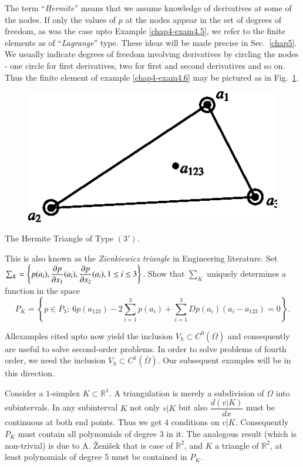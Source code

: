 \begin{remark}\label{chap4-rem4.2}
The term ``{\em Hermite}'' means that we assume knowledge of
derivatives at some of the nodes. If only the values of $p$ at the
nodes appear in the set of degrees of freedom, as was the case upto
Example \ref{chap4-exam4.5}, we refer to the finite elements as of
``{\em Lagrange}'' type. These ideas will be made precise in
Sec.~\ref{chap5}. We usually indicate degrees of freedom involving
derivatives by circling the nodes - one circle for first derivatives,
two for first and second derivatives and so on. Thus the finite
element of example \ref{chap4-exam4.6} may be pictured as in
Fig.~\ref{chap4-fig4.6}. 
\begin{figure}[H]
\centering
\includegraphics{figure/fig4.6.eps}
\caption{}\label{chap4-fig4.6}
\end{figure}
\end{remark}

\begin{exercise}\label{chap4-exer4.6}
The Hermite Triangle of Type $(3')$.

This is also known as the {\em Zienkiewicz triangle} in Engineering
literature. Set $\sum_{K}=\left\{p(a_{i}),\dfrac{\partial p}{\partial
  x_{1}}(a_{i}), \dfrac{\partial p}{\partial x_{2}}(a_{i}),1\leq i\leq
3\right\}$. Show that $\sum_{K}$ uniquely determines a function in the
space
$$
P_{K}=\left\{p\in
P_{3};\ 6p(a_{123})-2\sum^{3}_{i=1}p(a_{i})+\sum^{3}_{i=1}Dp(a_{i})(a_{i}-a_{123})=0\right\}. 
$$
\end{exercise}

All\pageoriginale examples cited upto now yield the inclusion
$V_{h}\subset C^{0}(\overline{\Omega})$ and consequently are useful to
solve second-order problems. In order to solve problems of fourth
order, we need the inclusion $V_{h}\subset
C^{1}(\overline{\Omega})$. Our subsequent examples will be in this
direction. 

\begin{remark}\label{chap4-rem4.3}
Consider a $1$-simplex $K\subset \mathbb{R}^{1}$. A triangulation is
merely a subdivision of $\Omega$ into subintervals. In any subinterval
$K$ not only $v|K$ but also $\dfrac{d(v|K)}{dx}$ must be continuous at
both end points. Thus we get 4 conditions on $v|K$. Consequently
$P_{K}$ must contain all polynomials of degree 3 in it. The analogous
result (which is non-trivial) is due to A. \v{Z}eni\v{s}ek
\cite{key24} that is case of $\mathbb{R}^{2}$, and $K$ a triangle of
$\mathbb{R}^{2}$, at least polynomials of degree 5 must be contained in
  $P_{K}$. 

\end{remark}

